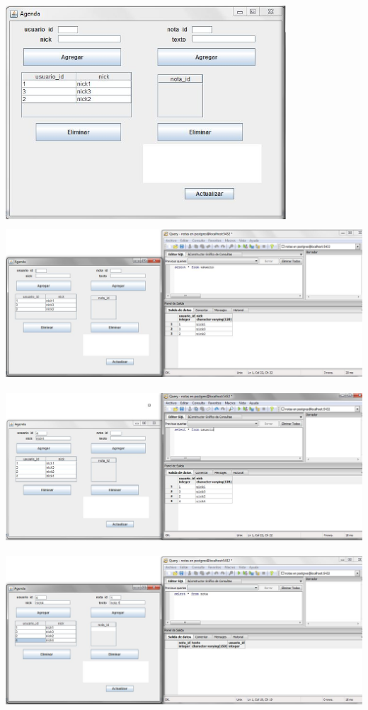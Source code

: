 \documentclass[12pt, oneside]{article}
\begin{document}
\begin{center}
	\includegraphics[height=8cm]{img/app/1.jpg}
	\includegraphics[height=6cm]{img/app/2.jpg}
	\includegraphics[height=6cm]{img/app/3.jpg}
	\includegraphics[height=6cm]{img/app/4.jpg}

\end{center}
\end{document}
